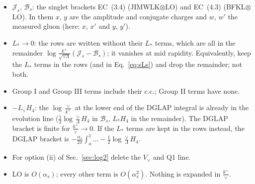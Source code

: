 \documentclass[10pt]{article}
\numberwithin{equation}{section}
\newcommand{\new}[1]{{\color{blue}#1}}
\newcommand{\Lv}{L_{\vee}}
\newcommand{\Ls}{L_{*}}
\newcommand{\JJ}{\mathcal J}
\newcommand{\BB}{\mathcal B}
\begin{document}
\begin{itemize}
\item $\JJ_s$, $\BB_s$: the singlet brackets EC~(3.4) (JIMWLK$\otimes$LO) and EC~(4.3) (BFKL$\otimes$LO). In them $x$, $y$ are the amplitude and conjugate charges and $w$, $w'$ the measured gluon (here: $x$, $x'$ and $y$, $y'$).
\item $\Ls\to0$: the rows are written without their $\Ls$ terms, which are all in the remainder $\log\frac{k^+}{\sqrt{\vee\Lambda}}(\JJ_s-\BB_s)$; it vanishes at mid rapidity. Equivalently, keep the $\Ls$ terms in the rows (and in Eq.~\eqref{eq:sLs}) and drop the remainder; not both.
\item Group I and Group III terms include their c.c.; Group II terms have none.
\item \new{$-\Lv H_4$: the $\log\frac{\vee}{k^+}$ at the lower end of the DGLAP integral is already in the evolution line ($\frac12\log\frac\vee\Lambda H_4$ in $\BB_s$, $\Ls H_4$ in the remainder). The DGLAP bracket is finite for $\frac{k^+}{\vee}\to0$. If the $\Ls$ terms are kept in the rows instead, the DGLAP bracket is $-\frac{\alpha_s}{2\pi}\int_a^1\dots-\frac12\log\frac\vee\Lambda H_4$.}
\item For option (ii) of Sec.~\ref{sec:log2} delete the $V_\vee$ and Q1 line.
\item LO is $O(\alpha_s)$; every other term is $O(\alpha_s^2)$. Nothing is expanded in $\frac{k^+}{\vee}$.
\end{itemize}

\end{document}
